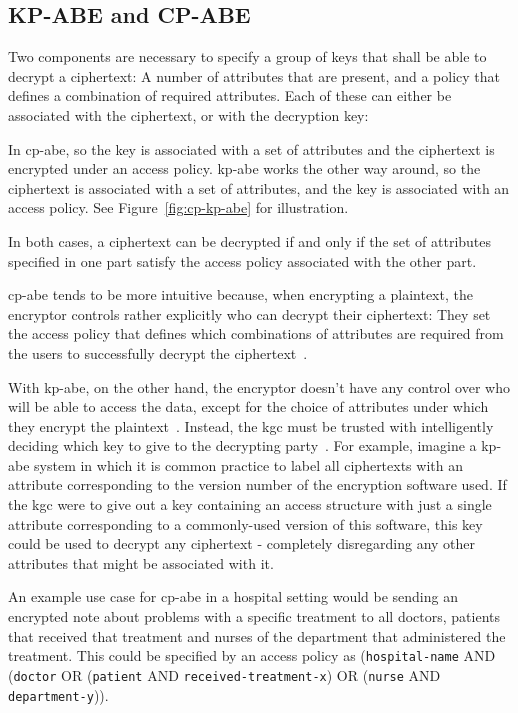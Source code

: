 \subsection{KP-ABE and CP-ABE}\label{sec:cp-vs-kp}

Two components are necessary to specify a group of keys that shall be able to decrypt a ciphertext: A number of attributes that are present, and a policy that defines a combination of required attributes. 
Each of these can either be associated with the ciphertext, or with the decryption key:

In \acrfull{cp-abe}, so the key is associated with a set of attributes and the ciphertext is encrypted under an access policy.
\acrfull{kp-abe} works the other way around, so the ciphertext is associated with a set of attributes, and the key is associated with an access policy.
See Figure~\ref{fig:cp-kp-abe} for illustration.

In both cases, a ciphertext can be decrypted if and only if the set of attributes specified in one part satisfy the access policy associated with the other part.

\acrshort{cp-abe} tends to be more intuitive because, when encrypting a plaintext, the encryptor controls rather explicitly who can decrypt their ciphertext:
They set the access policy that defines which combinations of attributes are required from the users to successfully decrypt the ciphertext~\cite{bethencourt_ciphertext-policy_2007}.

With \acrshort{kp-abe}, on the other hand, the encryptor doesn't have any control over who will be able to access the data, except for the choice of attributes under which they encrypt the plaintext~\cite{bethencourt_ciphertext-policy_2007}.
Instead, the \acrlong{kgc} must be trusted with intelligently deciding which key to give to the decrypting party~\cite{bethencourt_ciphertext-policy_2007}.
For example, imagine a \acrshort{kp-abe} system in which it is common practice to label all ciphertexts with an attribute corresponding to the version number of the encryption software used.
If the \acrshort{kgc} were to give out a key containing an access structure with just a single attribute corresponding to a commonly-used version of this software, this key could be used to decrypt any ciphertext - completely disregarding any other attributes that might be associated with it.

An example use case for \acrshort{cp-abe} in a hospital setting would be sending an encrypted note about problems with a specific treatment to all doctors, patients that received that treatment and nurses of the department that administered the treatment.
This could be specified by an access policy as (\texttt{hospital-name} AND (\texttt{doctor} OR (\texttt{patient} AND \texttt{received-treatment-x}) OR (\texttt{nurse} AND \texttt{department-y})). %

